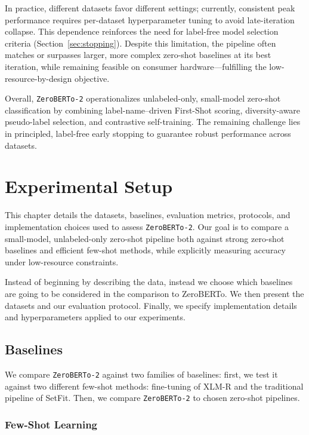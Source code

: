 \documentclass[]{politex-xico}
\begin{document}
In practice, different datasets favor different settings; currently, consistent peak performance requires per-dataset hyperparameter tuning to avoid late-iteration collapse. This dependence reinforces the need for label-free model selection criteria (Section~\ref{sec:stopping}). Despite this limitation, the pipeline often matches or surpasses larger, more complex zero-shot baselines at its best iteration, while remaining feasible on consumer hardware—fulfilling the low-resource-by-design objective.

\medskip
Overall, \texttt{ZeroBERTo-2} operationalizes unlabeled-only, small-model zero-shot classification by combining label-name–driven First-Shot scoring, diversity-aware pseudo-label selection, and contrastive self-training. The remaining challenge lies in principled, label-free early stopping to guarantee robust performance across datasets.


\chapter{Experimental Setup}
\label{chapter_test}

This chapter details the datasets, baselines, evaluation metrics, protocols, and implementation choices used to assess \texttt{ZeroBERTo-2}. Our goal is to compare a small-model, unlabeled-only zero-shot pipeline both against strong zero-shot baselines and efficient few-shot methods, while explicitly measuring accuracy under low-resource constraints.

Instead of beginning by describing the data, instead we choose which baselines are going to be considered in the comparison to ZeroBERTo. We then present the datasets and our evaluation protocol. Finally, we specify implementation details and hyperparameters applied to our experiments.

\section{Baselines}
\label{sec:baselines}



We compare \texttt{ZeroBERTo-2} against two families of baselines: first, we test it against two different few-shot methods: fine-tuning of XLM-R and the traditional pipeline of SetFit. Then, we compare \texttt{ZeroBERTo-2} to chosen zero-shot pipelines.

\subsection{Few-Shot Learning}
\end{document}
